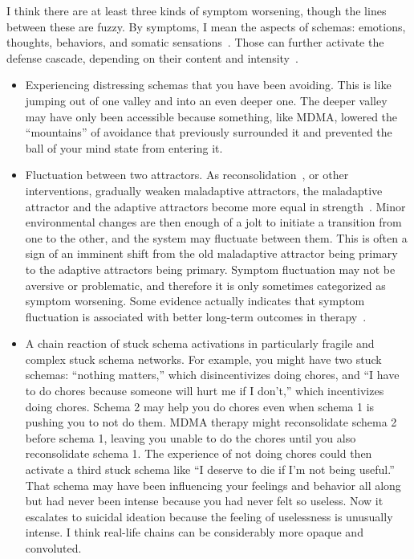 \documentclass[11pt,oneside]{book}
\let\cite\parencite
\begin{document}
I think there are at least three kinds of symptom worsening, though the lines between these are fuzzy. By symptoms, I mean the aspects of schemas: emotions, thoughts, behaviors, and somatic sensations~\cite{eckerUnlocking}. Those can further activate the defense cascade, depending on their content and intensity~\cite{kozlowskaDefenseCascade}.
\begin{itemize}
    \item Experiencing distressing schemas that you have been avoiding. This is like jumping out of one valley and into an even deeper one. The deeper valley may have only been accessible because something, like MDMA, lowered the \enquote{mountains} of avoidance that previously surrounded it and prevented the ball of your mind state from entering it.
    \item Fluctuation between two attractors. As reconsolidation~\cite{eckerUnlocking}, or other interventions, gradually weaken maladaptive attractors, the maladaptive attractor and the adaptive attractors become more equal in strength~\cite{hayes2020complex}. Minor environmental changes are then enough of a jolt to initiate a transition from one to the other, and the system may fluctuate between them. This is often a sign of an imminent shift from the old maladaptive attractor being primary to the adaptive attractors being primary. Symptom fluctuation may not be aversive or problematic, and therefore it is only sometimes categorized as symptom worsening. Some evidence actually indicates that symptom fluctuation is associated with better long-term outcomes in therapy~\cite{olthofDestabilization}.
    \item A chain reaction of stuck schema activations in particularly fragile and complex stuck schema networks. For example, you might have two stuck schemas: \enquote{nothing matters,} which disincentivizes doing chores, and \enquote{I have to do chores because someone will hurt me if I don't,} which incentivizes doing chores. Schema 2 may help you do chores even when schema 1 is pushing you to not do them. MDMA therapy might reconsolidate schema 2 before schema 1, leaving you unable to do the chores until you also reconsolidate schema 1. The experience of not doing chores could then activate a third stuck schema like \enquote{I deserve to die if I'm not being useful.} That schema may have been influencing your feelings and behavior all along but had never been intense because you had never felt so useless. Now it escalates to suicidal ideation because the feeling of uselessness is unusually intense. I think real-life chains can be considerably more opaque and convoluted.
\end{itemize}
\end{document}
